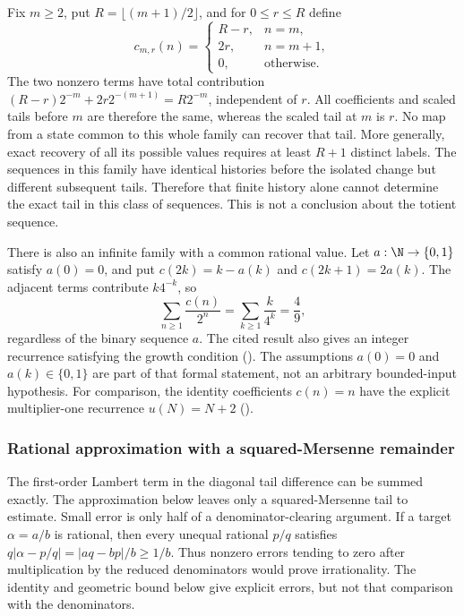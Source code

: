 \begin{obs}
Fix $m\ge2$, put $R=\lfloor(m+1)/2\rfloor$, and for
$0\le r\le R$ define
\[
 c_{m,r}(n)=
 \begin{cases}
  R-r,&n=m,\\
  2r,&n=m+1,\\
  0,&\text{otherwise}.
 \end{cases}
\]
The two nonzero terms have total contribution
$(R-r)2^{-m}+2r2^{-(m+1)}=R2^{-m}$, independent of $r$.
All coefficients and scaled tails before $m$ are therefore the same,
whereas the scaled tail at $m$ is $r$.
No map from a state common to this whole family can recover that tail.
More generally, exact recovery of all its possible values requires at
least $R+1$ distinct labels.
\quad {}
The sequences in this family have identical histories before the isolated
change but different subsequent tails. Therefore that finite history alone
cannot determine the exact tail in this class of sequences. This is
not a conclusion about the totient sequence.
\end{obs}

There is also an infinite family with a common rational value.
Let $a:\N\to\{0,1\}$ satisfy $a(0)=0$, and put
$c(2k)=k-a(k)$ and $c(2k+1)=2a(k)$. The adjacent terms contribute
$k4^{-k}$, so
\[
 \sum_{n\ge1}\frac{c(n)}{2^n}
   =\sum_{k\ge1}\frac{k}{4^k}=\frac49,
\]
regardless of the binary sequence $a$. The cited result also gives an
integer recurrence satisfying the growth condition
().
The assumptions $a(0)=0$ and $a(k)\in\{0,1\}$ are part of that
formal statement, not an arbitrary bounded-input hypothesis.
For comparison, the identity coefficients $c(n)=n$ have the explicit
multiplier-one recurrence $u(N)=N+2$
().

\subsubsection{Rational approximation with a squared-Mersenne remainder}

The first-order Lambert term in the diagonal tail difference can be
summed exactly. The approximation below leaves only a squared-Mersenne
tail to estimate.
Small error is only half of a denominator-clearing argument. If a
target $\alpha=a/b$ is rational, then every unequal rational $p/q$
satisfies $q|\alpha-p/q|=|aq-bp|/b\ge1/b$. Thus nonzero errors
tending to zero after multiplication by the reduced denominators
would prove irrationality. The identity and geometric bound below
give explicit errors, but not that comparison with the denominators.


